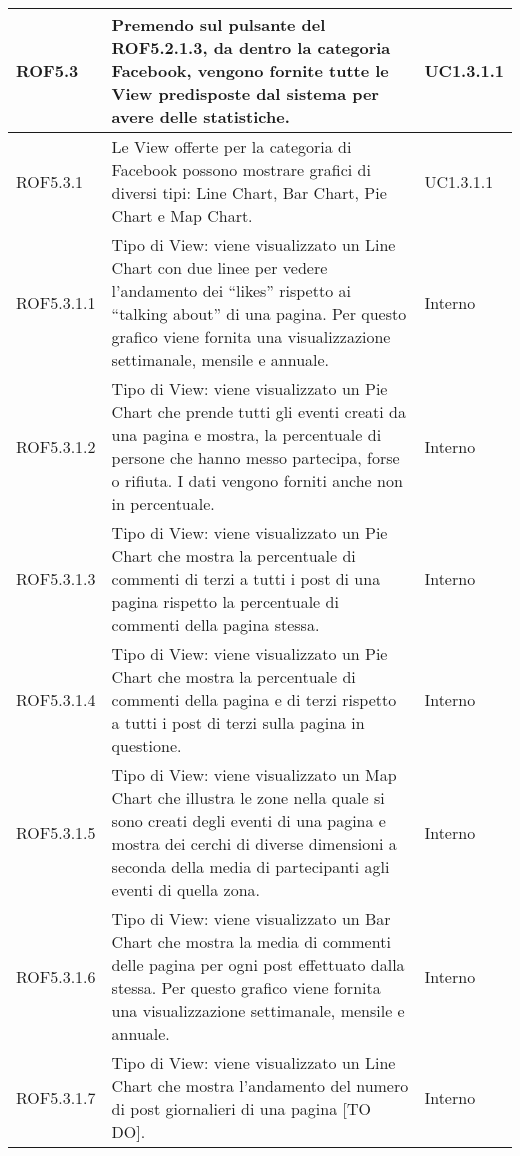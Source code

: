 \begin{center}
\begin{longtable}{| p{2.5cm} | p{8cm} | p{2cm} |}

		ROF5.3  & Premendo sul pulsante del ROF5.2.1.3, da dentro la categoria Facebook, vengono fornite tutte le View predisposte dal sistema per avere delle statistiche. & UC1.3.1.1 \\
		\hline
		ROF5.3.1  & Le View offerte per la categoria di Facebook possono mostrare grafici di diversi tipi: Line Chart, Bar Chart, Pie Chart e Map Chart. &  UC1.3.1.1  \\
		\hline
		ROF5.3.1.1  & Tipo di View: viene visualizzato un Line Chart con due linee per vedere l'andamento dei ``likes'' rispetto ai ``talking about'' di una pagina. Per questo grafico viene fornita una visualizzazione settimanale, mensile e annuale.  & Interno \\
		\hline
		ROF5.3.1.2  &  Tipo di View: viene visualizzato un Pie Chart che prende tutti gli eventi creati da una pagina e mostra, la percentuale di persone che hanno messo partecipa, forse o rifiuta. I dati vengono forniti anche non in percentuale. & Interno \\
		\hline
		ROF5.3.1.3  &  Tipo di View: viene visualizzato un Pie Chart che mostra la percentuale di commenti di terzi a tutti i post di una pagina rispetto la percentuale di commenti della pagina stessa. & Interno \\
		\hline
		ROF5.3.1.4  &  Tipo di View: viene visualizzato un Pie Chart che mostra la percentuale di commenti della pagina e di terzi rispetto a tutti i post di terzi sulla pagina in questione. & Interno \\
		\hline
		ROF5.3.1.5  &  Tipo di View: viene visualizzato un Map Chart che illustra le zone nella quale si sono creati degli eventi di una pagina e mostra dei cerchi di diverse dimensioni a seconda della media di partecipanti agli eventi di quella zona. & Interno \\
		\hline
		ROF5.3.1.6  &  Tipo di View: viene visualizzato un Bar Chart che mostra la media di commenti delle pagina per ogni post effettuato dalla stessa. Per questo grafico viene fornita una visualizzazione settimanale, mensile e annuale. & Interno \\
		\hline
		ROF5.3.1.7  &  Tipo di View: viene visualizzato un Line Chart che mostra l’andamento del numero di post giornalieri di una pagina [TO DO]. & Interno \\
		\hline



\end{longtable}
\end{center}
